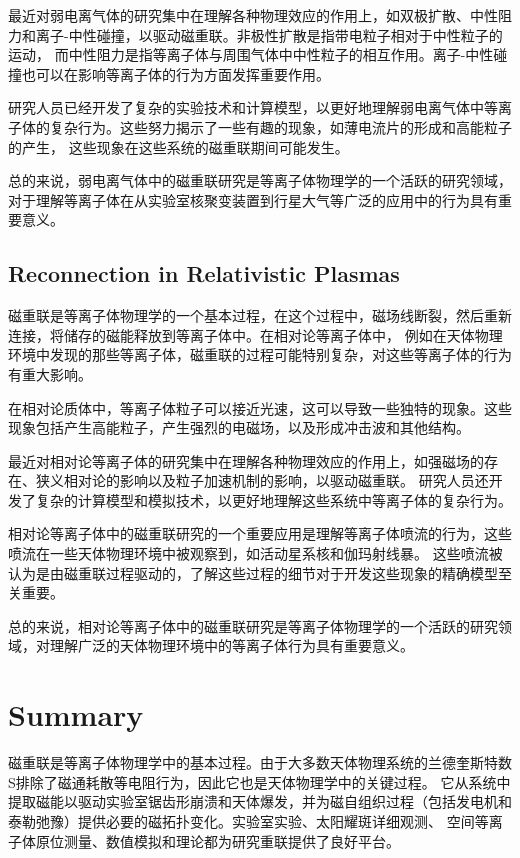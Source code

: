 \documentclass[12pt, a4paper, oneside]{article}
\begin{document}
\begin{spacing}{2.0}
最近对弱电离气体的研究集中在理解各种物理效应的作用上，如双极扩散、中性阻力和离子-中性碰撞，以驱动磁重联。非极性扩散是指带电粒子相对于中性粒子的运动，
而中性阻力是指等离子体与周围气体中中性粒子的相互作用。离子-中性碰撞也可以在影响等离子体的行为方面发挥重要作用。

研究人员已经开发了复杂的实验技术和计算模型，以更好地理解弱电离气体中等离子体的复杂行为。这些努力揭示了一些有趣的现象，如薄电流片的形成和高能粒子的产生，
这些现象在这些系统的磁重联期间可能发生。

总的来说，弱电离气体中的磁重联研究是等离子体物理学的一个活跃的研究领域，对于理解等离子体在从实验室核聚变装置到行星大气等广泛的应用中的行为具有重要意义。
\subsection{Reconnection in Relativistic Plasmas}
磁重联是等离子体物理学的一个基本过程，在这个过程中，磁场线断裂，然后重新连接，将储存的磁能释放到等离子体中。在相对论等离子体中，
例如在天体物理环境中发现的那些等离子体，磁重联的过程可能特别复杂，对这些等离子体的行为有重大影响。

在相对论质体中，等离子体粒子可以接近光速，这可以导致一些独特的现象。这些现象包括产生高能粒子，产生强烈的电磁场，以及形成冲击波和其他结构。

最近对相对论等离子体的研究集中在理解各种物理效应的作用上，如强磁场的存在、狭义相对论的影响以及粒子加速机制的影响，以驱动磁重联。
研究人员还开发了复杂的计算模型和模拟技术，以更好地理解这些系统中等离子体的复杂行为。

相对论等离子体中的磁重联研究的一个重要应用是理解等离子体喷流的行为，这些喷流在一些天体物理环境中被观察到，如活动星系核和伽玛射线暴。
这些喷流被认为是由磁重联过程驱动的，了解这些过程的细节对于开发这些现象的精确模型至关重要。

总的来说，相对论等离子体中的磁重联研究是等离子体物理学的一个活跃的研究领域，对理解广泛的天体物理环境中的等离子体行为具有重要意义。






\section{Summary}
磁重联是等离子体物理学中的基本过程。由于大多数天体物理系统的兰德奎斯特数S排除了磁通耗散等电阻行为，因此它也是天体物理学中的关键过程。
它从系统中提取磁能以驱动实验室锯齿形崩溃和天体爆发，并为磁自组织过程（包括发电机和泰勒弛豫）提供必要的磁拓扑变化。实验室实验、太阳耀斑详细观测、
空间等离子体原位测量、数值模拟和理论都为研究重联提供了良好平台。


\end{spacing}
\end{document}
